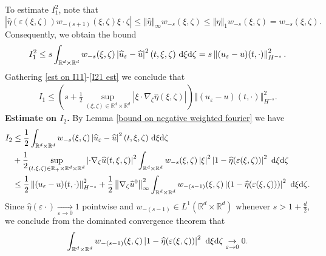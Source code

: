 \documentclass[11pt,reqno]{amsart}
\numberwithin{equation}{section}
\def\dd{{\rm d}}
\begin{document}
To estimate $I_{1}^{2}$, note that 
$$\left\vert \widehat{\eta}(\varepsilon(\xi,\zeta))w_{-(s+1)}(\xi,\zeta)\xi \cdot \zeta \right\vert\leq \left\Vert \widehat{\eta}\right\Vert_{\infty} w_{-s}(\xi,\zeta)\leq \left\Vert \eta\right\Vert_{1}w_{-s}(\xi,\zeta)=w_{-s}(\xi,\zeta).     
$$ 
Consequently, we obtain the bound  
\begin{align}
I_{1}^{2}\leq s\int_{\mathbb{R}^{d}\times \mathbb{R}^{d}}w_{-s}(\xi,\zeta)\left\vert \widehat{u}_{\varepsilon}-\widehat{u}\right\vert^{2}(t,\xi,\zeta)\ \dd \xi\dd \zeta=s\left\Vert (u_{\varepsilon}-u)(t,\cdot)\right\Vert_{H^{-s}}^{2}. \label{I21 est}  
\end{align}
Gathering \eqref{est on I11}-\eqref{I21 est} we conclude that 
\begin{align}
I_{1}\leq \left(s+\frac{1}{2}\underset{(\xi,\zeta)\in \mathbb{R}^{d}\times \mathbb{R}^{d}}{\sup}\left\vert \xi \cdot \nabla_{\zeta}\widehat{\eta}(\xi,\zeta)\right\vert \right)\left\Vert (u_{\varepsilon}-u)(t,\cdot)\right\Vert_{H^{-s}}^{2}. \label{I1 est}     
\end{align}
\textbf{Estimate on $I_{2}$.} By Lemma \ref{bound on negative weighted fourier} we have 
\begin{align*}
I_{2}&\leq \frac{1}{2}\int_{\mathbb{R}^{d}\times \mathbb{R}^{d}}w_{-s}(\xi,\zeta)\left\vert \widehat{u}_{\varepsilon}-\widehat{u}\right\vert^{2}(t,\xi,\zeta)\ \dd \xi\dd \zeta\\
&+\frac{1}{2}\underset{(t,\xi,\zeta)\in \mathbb{R}_{+}\times\mathbb{R}^{d}\times \mathbb{R}^{d}}{\sup}\left\vert \cdot \nabla_{\zeta}\widehat{u}(t,\xi,\zeta)\right\vert^{2} \int_{\mathbb{R}^{d}\times \mathbb{R}^{d}}w_{-s}(\xi,\zeta)\left\vert \xi\right\vert^{2}\left\vert 1-\widehat{\eta}(\varepsilon(\xi,\zeta))\right\vert^{2}\ \dd \xi\dd \zeta\\
&\leq \frac{1}{2}\left\Vert (u_{\varepsilon}-u)(t,\cdot)\right\Vert_{H^{-s}}^{2}+\frac{1}{2}\left\Vert \nabla_{\zeta}\widehat{u}^{0}\right\Vert_{\infty}^{2} \int_{\mathbb{R}^{d}\times \mathbb{R}^{d}}w_{-(s-1)}(\xi,\zeta)\left\vert (1-\widehat{\eta}(\varepsilon(\xi,\zeta)))\right\vert^{2}\ \dd \xi\dd \zeta .  
\end{align*}
Since $\widehat{\eta}(\varepsilon\cdot )\underset{\varepsilon\rightarrow 0}{\rightarrow} 1$ pointwise and $w_{-(s-1)}\in L^{1}(\mathbb{R}^{d}\times \mathbb{R}^{d})$ whenever $s>1+\frac{d}{2}$, we conclude from the dominated convergence theorem that 
\begin{align*}
\int_{\mathbb{R}^{d}\times \mathbb{R}^{d}}w_{-(s-1)}(\xi,\zeta)\left\vert 1-\widehat{\eta}(\varepsilon(\xi,\zeta))\right\vert^{2}\ \dd \xi\dd \zeta\underset{\varepsilon \rightarrow 0}{\rightarrow}0.    
\end{align*}
\end{document}
